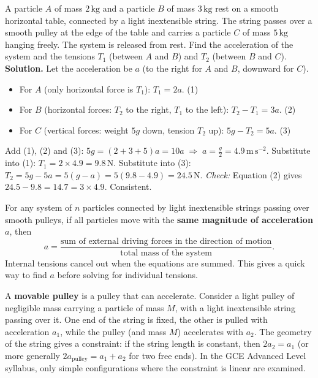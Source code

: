 \documentclass[11pt]{article}
\newcounter{popsec}
\newcounter{popsub}
\newcommand{\courssub}[1]{%
  \stepcounter{popsub}%
  \par\vspace{9pt}\noindent{\popxbold\fontsize{11.5}{13}\selectfont\color{popink}{\color{poporange}\thepopsec.\thepopsub}\hspace{6pt}#1}\par\nopagebreak\vspace{4pt}
}
\begin{document}
\begin{exoresolu}
A particle $A$ of mass $2\,\mathrm{kg}$ and a particle $B$ of mass $3\,\mathrm{kg}$ rest on a smooth horizontal table, connected by a light inextensible string. The string passes over a smooth pulley at the edge of the table and carries a particle $C$ of mass $5\,\mathrm{kg}$ hanging freely. The system is released from rest. Find the acceleration of the system and the tensions $T_1$ (between $A$ and $B$) and $T_2$ (between $B$ and $C$).
\tcblower
\textbf{Solution.}
Let the acceleration be $a$ (to the right for $A$ and $B$, downward for $C$).
\begin{itemize}
\item For $A$ (only horizontal force is $T_1$): $T_1 = 2a$. \hfill (1)
\item For $B$ (horizontal forces: $T_2$ to the right, $T_1$ to the left): $T_2 - T_1 = 3a$. \hfill (2)
\item For $C$ (vertical forces: weight $5g$ down, tension $T_2$ up): $5g - T_2 = 5a$. \hfill (3)
\end{itemize}
Add (1), (2) and (3): $5g = (2+3+5)a = 10a \;\Rightarrow\; a = \frac{g}{2} = 4.9\,\mathrm{m\,s^{-2}}$.
Substitute into (1): $T_1 = 2 \times 4.9 = 9.8\,\mathrm{N}$.
Substitute into (3): $T_2 = 5g - 5a = 5(g - a) = 5(9.8 - 4.9) = 24.5\,\mathrm{N}$.
\emph{Check:} Equation (2) gives $24.5 - 9.8 = 14.7 = 3 \times 4.9$. Consistent.
\end{exoresolu}

\begin{propriete}
For any system of $n$ particles connected by light inextensible strings passing over smooth pulleys, if all particles move with the \textbf{same magnitude of acceleration} $a$, then
\[
a = \frac{\text{sum of external driving forces in the direction of motion}}{\text{total mass of the system}}.
\]
Internal tensions cancel out when the equations are summed. This gives a quick way to find $a$ before solving for individual tensions.
\end{propriete}

\courssub{Movable Pulleys (Simple Cases)}

A \textbf{movable pulley} is a pulley that can accelerate. Consider a light pulley of negligible mass carrying a particle of mass $M$, with a light inextensible string passing over it. One end of the string is fixed, the other is pulled with acceleration $a_1$, while the pulley (and mass $M$) accelerates with $a_2$. The geometry of the string gives a constraint: if the string length is constant, then $2a_2 = a_1$ (or more generally $2a_{\text{pulley}} = a_1 + a_2$ for two free ends). In the GCE Advanced Level syllabus, only simple configurations where the constraint is linear are examined.
\end{document}
